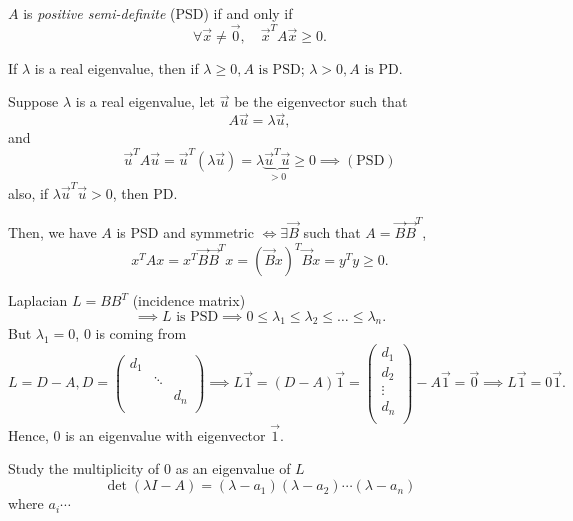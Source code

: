 \begin{definition}
	\(A \) is \emph{positive semi-definite} (PSD) if and only if
	\[
		\forall \vec{x} \neq  \vec{0},\quad \vec{x}^{T}A \vec{x} \geq  0.
	\]
\end{definition}

\begin{remark}
	If \(\lambda\) is a real eigenvalue, then if \(\lambda \geq  0, A \text{ is PSD}\); \(\lambda > 0, A \text{ is PD}\).
\end{remark}
\begin{explanation}
	Suppose \(\lambda\) is a real eigenvalue, let \(\vec{u}\) be the eigenvector such that
	\[
		A \vec{u} = \lambda \vec{u},
	\]
	and
	\[
		\vec{u}^{T} A \vec{u} = \vec{u}^{T} (\lambda \vec{u}) = \lambda \underbrace{\vec{u}^{T}\vec{u}}_{>0} \geq 0\implies(\text{PSD})
	\]
	also, if \(\lambda \vec{u}^{T} \vec{u} > 0\), then PD.

	Then, we have \(A\) is PSD and symmetric \(\iff \exists \vec{B}\) such that \(A = \vec{B} \vec{B}^{T}\),
	\[
		x^{T} A x = x^{T} \vec{B} \vec{B}^{T} x = (\vec{B}x)^{T} \vec{B}x = y^{T} y \geq 0.
	\]

	Laplacian \(L = B B^{T}\) (incidence matrix)
	\[
		\implies L \text{ is PSD}\implies 0 \leq \lambda_1 \leq \lambda_2 \leq \ldots \leq \lambda_n.
	\]
	But \(\lambda_1 = 0\), \(0\) is coming from
	\[
		L = D-A, D = \begin{pmatrix}
			d_1 &        &     \\
			    & \ddots &     \\
			    &        & d_n \\
		\end{pmatrix}\implies L \vec{1} = (D - A)\vec{1} = \begin{pmatrix}
			d_1    \\
			d_2    \\
			\vdots \\
			d_n    \\
		\end{pmatrix} - A\vec{1} = \vec{0}\implies L \vec{1} = 0 \vec{1}.
	\]
	Hence, \(0\) is an eigenvalue with eigenvector \(\vec{1}\).
\end{explanation}

\begin{note}
	Study the multiplicity of \(0\) as an eigenvalue of \(L\)
	\[
		\det(\lambda I - A) = (\lambda - a_1)(\lambda - a_2)\cdots (\lambda - a_n)
	\]
	where \(a_i\cdots \)
\end{note}

